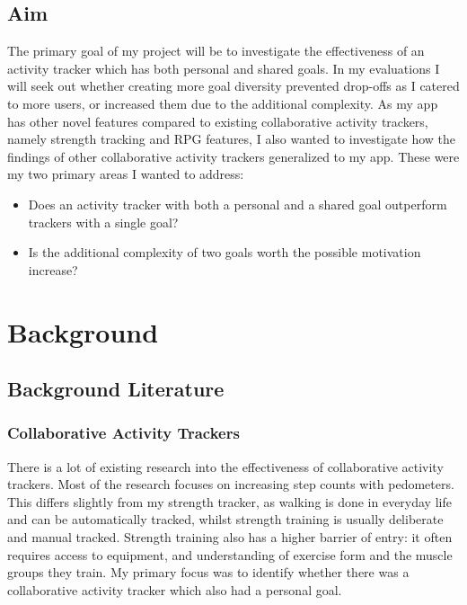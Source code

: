 \documentclass{l4proj}
\begin{document}
%
%
%

\section{Aim}
The primary goal of my project will be to investigate the effectiveness of an activity tracker which has both personal and shared goals. In my evaluations I will seek out whether creating more goal diversity prevented drop-offs as I catered to more users, or increased them due to the additional complexity. As my app has other novel features compared to existing collaborative activity trackers, namely strength tracking and RPG features, I also wanted to investigate how the findings of other collaborative activity trackers generalized to my app. These were my two primary areas I wanted to address:
\begin{itemize}
  \item Does an activity tracker with both a personal and a shared goal outperform trackers with a single goal?
  \item Is the additional complexity of two goals worth the possible motivation increase?
\end{itemize}
  




\chapter{Background}

\section{Background Literature}

\subsection{Collaborative Activity Trackers}
There is a lot of existing research into the effectiveness of collaborative activity trackers. Most of the research focuses on increasing step counts with pedometers. This differs slightly from my strength tracker, as walking is done in everyday life and can be automatically tracked, whilst strength training is usually deliberate and manual tracked. Strength training also has a higher barrier of entry: it often requires access to equipment, and understanding of exercise form and the muscle groups they train. My primary focus was to identify whether there was a collaborative activity tracker which also had a personal goal.
\end{document}
